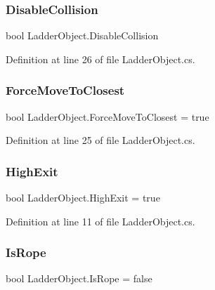 \subsubsection{\texorpdfstring{Disable\+Collision}{DisableCollision}}
{\footnotesize\ttfamily bool Ladder\+Object.\+Disable\+Collision}



Definition at line 26 of file Ladder\+Object.\+cs.

\mbox{\label{class_ladder_object_a86fa41ca3666a9924efed8179d0a9107}} 
\subsubsection{\texorpdfstring{Force\+Move\+To\+Closest}{ForceMoveToClosest}}
{\footnotesize\ttfamily bool Ladder\+Object.\+Force\+Move\+To\+Closest = true}



Definition at line 25 of file Ladder\+Object.\+cs.

\mbox{\label{class_ladder_object_a4ab6f84e191215d1c73ef980cf46ead2}} 
\subsubsection{\texorpdfstring{High\+Exit}{HighExit}}
{\footnotesize\ttfamily bool Ladder\+Object.\+High\+Exit = true}



Definition at line 11 of file Ladder\+Object.\+cs.

\mbox{\label{class_ladder_object_adb3c861b53e404aa95a11436fe23cde6}} 
\subsubsection{\texorpdfstring{Is\+Rope}{IsRope}}
{\footnotesize\ttfamily bool Ladder\+Object.\+Is\+Rope = false}



